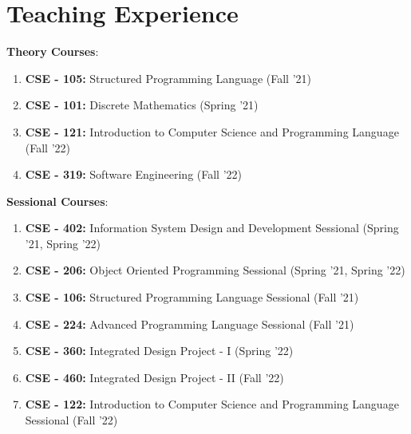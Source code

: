 \section{Teaching Experience}
\resumeSubHeadingListStart



\resumeProjectHeading
{\textbf{Theory Courses}$:$ \emph{}}{}

\begin{enumerate}
\item \textbf{CSE - 105:} Structured Programming Language (Fall '21)
\item \textbf{CSE - 101:} Discrete Mathematics (Spring '21)
\item \textbf{CSE - 121:} Introduction to Computer Science and Programming Language (Fall '22)
\item \textbf{CSE - 319:} Software Engineering (Fall '22)

\end{enumerate}


\resumeProjectHeading
{\textbf{Sessional Courses}$:$ \emph{}}{}

\begin{enumerate}
\item \textbf{CSE - 402:} Information System Design and Development Sessional (Spring '21, Spring '22)
\item \textbf{CSE - 206:} Object Oriented Programming Sessional (Spring '21, Spring '22)
\item \textbf{CSE - 106:} Structured Programming Language Sessional (Fall '21)
\item \textbf{CSE - 224:} Advanced Programming Language Sessional (Fall '21)
\item \textbf{CSE - 360:} Integrated Design Project -  I (Spring '22) 
\item \textbf{CSE - 460:} Integrated Design Project -  II (Fall '22)
\item \textbf{CSE - 122:} Introduction to Computer Science and Programming Language Sessional (Fall '22)
\end{enumerate}
